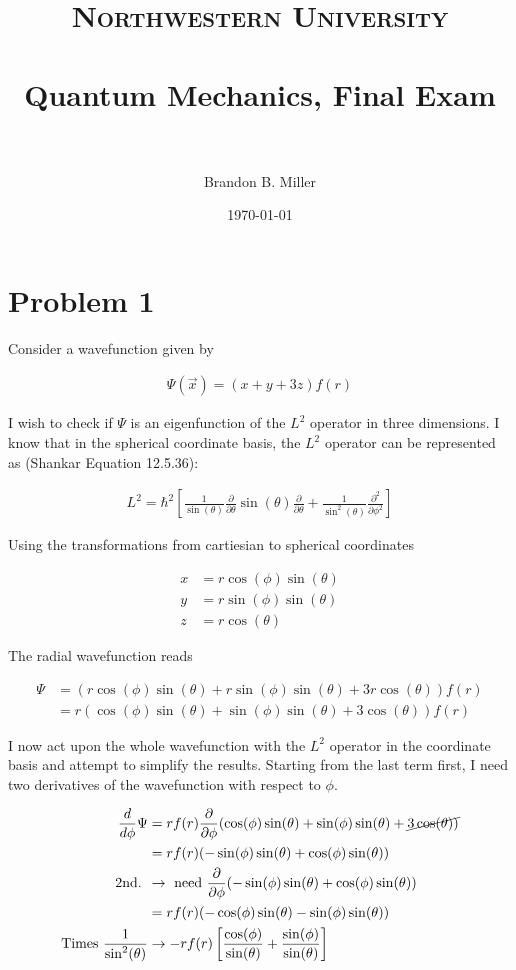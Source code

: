 \documentclass[paper=a4, fontsize=11pt]{scrartcl} %
\title{	
\normalfont \normalsize 
\textsc{Northwestern University} \\ [25pt] %
\horrule{0.5pt} \\[0.4cm] %
\huge Quantum Mechanics, Final Exam \\ %
\horrule{2pt} \\[0.5cm] %
}
\author{Brandon B. Miller} %
\date{\normalsize\today} %
\numberwithin{equation}{section} %
\numberwithin{figure}{section} %
\numberwithin{table}{section} %
\begin{document}
\maketitle %

\section{Problem 1}

Consider a wavefunction given by

\begin{align}
\Psi(\vec{x}) = (x + y + 3z)f(r)
\end{align}

I wish to check if $\Psi$ is an eigenfunction of the $L^2$ operator in three dimensions. I know that in the spherical coordinate basis, the $L^2$ operator can be represented as (Shankar Equation 12.5.36):

\begin{align}
L^2 = \hbar^2 \left[ \frac{1}{\sin(\theta)}\frac{\partial}{\partial \theta}\sin(\theta)\frac{\partial}{\partial \theta} + \frac{1}{\sin^2(\theta)}\frac{\partial ^2}{\partial \phi^2} \right]
\end{align}

Using the transformations from cartiesian to spherical coordinates

\begin{align}
x &= r \cos(\phi)\sin(\theta) \\
y &= r \sin(\phi)\sin(\theta) \\
z &= r \cos(\theta)
\end{align}

The radial wavefunction reads

\begin{align}
\Psi &= (r\cos(\phi)\sin(\theta) + r\sin(\phi)\sin(\theta) + 3 r \cos(\theta))f(r) \\
&= r(\cos(\phi)\sin(\theta) + \sin(\phi)\sin(\theta) + 3 \cos(\theta))f(r) 
\end{align}


I now act upon the whole wavefunction with the $L^2$ operator in the coordinate basis and attempt to simplify the results. Starting from the last term first, I need two derivatives of the wavefunction with respect to $\phi$.

\begin{align}
\frac{d}{d\phi}\Psi &= rf(r)\frac{\partial}{\partial \phi} (\cos(\phi)\sin(\theta) + \sin(\phi)\sin(\theta) + \cancel{3 \cos(\theta))} \\
&= rf(r)(-\sin(\phi)\sin(\theta) + \cos(\phi)\sin(\theta)) \\
\text{2nd. }&\rightarrow \ \text{need} \ \frac{\partial}{\partial \phi} (-\sin(\phi)\sin(\theta) + \cos(\phi)\sin(\theta))  \\
&= rf(r)(-\cos(\phi)\sin(\theta) - \sin(\phi)\sin(\theta)) \\ 
\text{Times $\frac{1}{\sin^2(\theta)}$} &\rightarrow -rf(r)\left[\frac{\cos(\phi)}{\sin(\theta)} + \frac{\sin(\phi)}{\sin(\theta)} \right]
\end{align}
\end{document}
